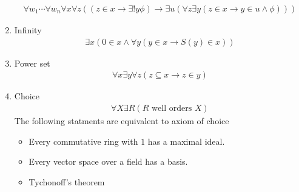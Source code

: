 \documentclass{article}
\theoremstyle{definition}
\begin{document}
\begin{enumerate}
    \begin{align*}
        \forall w_1 \cdots \forall w_n \forall x  \forall z(
            (z \in x \rightarrow \exists ! y \phi ) \rightarrow 
            \exists u (\forall z \exists y ( z \in x \rightarrow y \in u \wedge \phi))
        ) 
    \end{align*}
    \item Infinity
    \begin{align*}
        \exists x ( 0 \in x \wedge \forall y (y \in x \rightarrow S(y) \in x))
    \end{align*}
    \item Power set
    \begin{align*}
        \forall x \exists y \forall z  ( z \subseteq x \rightarrow z \in y)
    \end{align*}
    \item Choice 
    \begin{align*}
        \forall X \exists R (R \text{ well orders } X) 
    \end{align*}
    The following statments are equivalent to axiom of choice
    \begin{itemize}
        \item Every commutative ring with  $1$ has a maximal ideal.
        \item Every vector space over a field has a basis.
        \item Tychonoff's theorem
    \end{itemize}
\end{enumerate}
\end{document}
